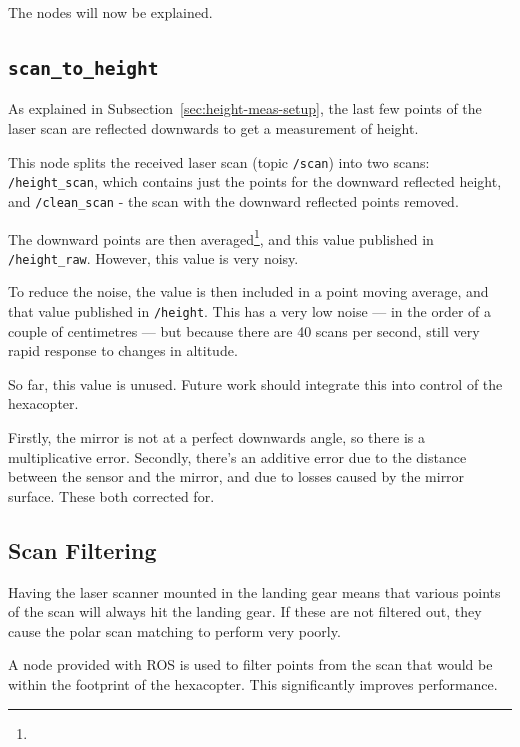 \documentclass[12pt,oneside,a4paper]{book}
\begin{document}
The nodes will now be explained.

\subsection{\texttt{scan\_to\_height}}
\label{sec:scan_to_height}

As explained in Subsection~\ref{sec:height-meas-setup}, the last few
points of the laser scan are reflected downwards to get a measurement
of height.

This node splits the received laser scan (topic \texttt{/scan}) into
two scans: \texttt{/height\_scan}, which contains just the points for
the downward reflected height, and \texttt{/clean\_scan} - the scan
with the downward reflected points removed.

The downward points are then averaged\footnote{}, and this value published in
\texttt{/height\_raw}. However, this value is very noisy. 

To reduce the noise, the value is then included in a   point moving average, and
that value published in \texttt{/height}. This has a very low noise
--- in the order of a couple of centimetres --- but because there are
40 scans per second, still very rapid response to changes in altitude.

So far, this value is unused. Future work should integrate this into
control of the hexacopter.

 Firstly, the mirror is not at a perfect downwards
angle, so there is a multiplicative error. Secondly, there's an
additive error due to the distance between the sensor and the mirror,
and due to losses caused by the mirror surface. These 
both corrected for.

\subsection{Scan Filtering}
\label{sec:scan-filtering}

Having the laser scanner mounted in the landing gear means that
various points of the scan will always hit the landing gear. If these
are not filtered out, they cause the polar scan matching to perform
very poorly.

A node provided with ROS is used to filter points from the scan that
would be within the footprint of the hexacopter. This significantly
improves performance.
\end{document}
